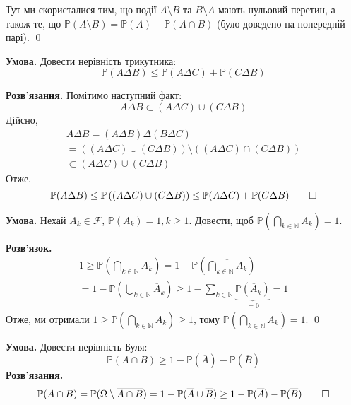 \documentclass[oneside,solution]{karazin-prob-theory-assign}
\begin{document}
Тут ми скористалися тим, що події $A \setminus B$ та $B \setminus A$ мають нульовий перетин, а також те, що $\mathbb{P}(A \setminus B) = \mathbb{P}(A) - \mathbb{P}(A \cap B)$ (було доведено на попередній парі). \qed 


\hspace{20px}\textbf{Умова.} Довести нерівність трикутника:
\begin{equation}
    \mathbb{P}(A \Delta B) \leq \mathbb{P}(A \Delta C)+\mathbb{P}(C \Delta B)
\end{equation}

\textbf{Розв'язання.} Помітимо наступний факт:
\begin{equation}
    A \Delta B \subset (A \Delta C) \cup (C \Delta B)
\end{equation}
Дійсно,
\begin{gather}
    A \Delta B = (A \Delta B) \Delta (B \Delta C)\nonumber \\ = ((A \Delta C) \cup (C \Delta B)) \setminus ((A \Delta C) \cap (C \Delta B)) \nonumber \\ \subset (A \Delta C) \cup (C \Delta B)
\end{gather}
Отже,
\begin{equation}
    \mathbb{P}(A \Delta B) \leq \mathbb{P}\left((A \Delta C) \cup (C \Delta B)\right) \leq \mathbb{P}(A \Delta C) + \mathbb{P}(C \Delta B)\qed
\end{equation}


\hspace{20px}\textbf{Умова.} Нехай $A_k \in \mathcal{F}$, $\mathbb{P}(A_k)=1,k \geq 1$. Довести, щоб $\mathbb{P}(\bigcap_{k \in \mathbb{N}}A_k)=1$.

\textbf{Розв'язок.} 
\begin{gather}
    1 \geq \mathbb{P}\left(\bigcap_{k \in \mathbb{N}}A_k\right) = 1 - \mathbb{P}\left(\overline{\bigcap_{k \in \mathbb{N}}A_k}\right) \nonumber \\
    = 1 - \mathbb{P}\left(\bigcup_{k \in \mathbb{N}}\overline{A}_k\right) \geq 1 - \sum_{k \in \mathbb{N}}\underbrace{\mathbb{P}(\overline{A}_k)}_{=0} = 1
\end{gather}
Отже, ми отримали $1 \geq \mathbb{P}\left(\bigcap_{k \in \mathbb{N}}A_k\right) \geq 1$, тому $\mathbb{P}\left(\bigcap_{k \in \mathbb{N}}A_k\right)=1$. \qed


\hspace{20px}\textbf{Умова.} Довести нерівність Буля:
\begin{equation}
    \mathbb{P}(A \cap B) \geq 1 - \mathbb{P}(\overline{A}) - \mathbb{P}(\overline{B})
\end{equation}
\textbf{Розв'язання.} 
\begin{equation}
    \mathbb{P}(A \cap B) = \mathbb{P}(\Omega \setminus \overline{A \cap B}) = 1 - \mathbb{P}(\overline{A} \cup \overline{B}) \geq 1-\mathbb{P}(\overline{A}) - \mathbb{P}(\overline{B})\qed
\end{equation}
\end{document}
